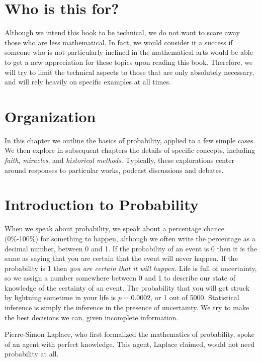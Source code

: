 \documentclass{tufte-book}
\begin{document}
\section{Who is this for?}\label{who-is-this-for}

Although we intend this book to be technical, we do not want to scare
away those who are less mathematical. In fact, we would consider it a
success if someone who is not particularly inclined in the mathematical
arts would be able to get a new appreciation for these topics upon
reading this book. Therefore, we will try to limit the technical aspects
to those that are only absolutely necessary, and will rely heavily on
specific examples at all times.

\section{Organization}\label{organization}

In this chapter we outline the basics of probability, applied to a few
simple cases. We then explore in subsequent chapters the details of
specific concepts, including \emph{faith}, \emph{miracles}, and
\emph{historical methods}. Typically, these explorations center around
responses to particular works, podcast discussions and debates.

\section{Introduction to Probability}\label{introduction-to-probability}

When we speak about probability, we speak about a percentage chance
(0\%-100\%) for something to happen, although we often write the
percentage as a decimal number, between 0 and 1. If the probability of
an event is 0 then it is the same as saying that you are certain that
the event will never happen. If the probability is 1 then \emph{you are
certain that it will happen}. Life is full of uncertainty, so we assign
a number somewhere between 0 and 1 to describe our state of knowledge of
the certainty of an event. The probability that you will get struck by
lightning sometime in your life is \(p=0.0002\), or 1 out of 5000.
Statistical inference is simply the inference in the presence of
uncertainty. We try to make the best decisions we can, given incomplete
information.

Pierre-Simon Laplace, who first formalized the mathematics of
probability, spoke of an agent with perfect knowledge. This agent,
Laplace claimed, would not need probability at all.
\end{document}
